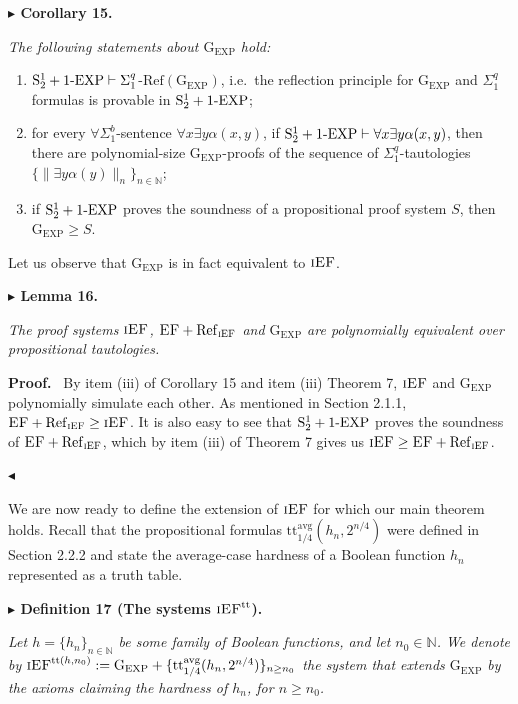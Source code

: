 \documentclass[11pt]{article}
\newcommand{\Stwo}{\mathrm{S}^{1}_{2}}
\newcommand{\oneEXP}{\textnormal{1-EXP}}
\newcommand{\iEF}{\textsc{iEF}}
\newcommand{\EF}{\textsc{EF}}
\newcommand{\GEXP}{\mathrm{G}_{\mathrm{EXP}}}
\newcommand{\N}{\mathbb{N}}
\newcommand{\RefP}{\mathrm{Ref}}
\newcommand{\ttavg}{\mathrm{tt}^{\mathrm{avg}}}
\newcommand{\iEFtt}[1]{\iEF^{\mathrm{tt}(#1)}}
\newenvironment{statement}[1]%
  {\par\medskip\noindent\textbf{#1}\par\nopagebreak\smallskip\noindent\itshape}%
  {\par\medskip}
\newenvironment{authorproof}%
  {\par\medskip\noindent\textbf{Proof.}\ \ignorespaces}%
  {\unskip\par\nopagebreak\smallskip\noindent\hfill$\blacktriangleleft$\par\medskip}
\begin{document}
\begin{statement}{$\blacktriangleright$ Corollary 15.}
The following statements about $\GEXP$ hold:
\begin{enumerate}
\item[(i)] $\Stwo+\oneEXP \vdash \Sigma^{q}_{1}$-$\RefP(\GEXP)$, i.e.\ the reflection principle
  for $\GEXP$ and $\Sigma^{q}_{1}$ formulas is provable in $\Stwo+\oneEXP$;
\item[(ii)] for every $\forall\Sigma^{b}_{1}$-sentence $\forall x\exists y\alpha(x,y)$, if
  $\Stwo+\oneEXP \vdash \forall x\exists y\alpha(x,y)$, then there are polynomial-size
  $\GEXP$-proofs of the sequence of $\Sigma^{q}_{1}$-tautologies
  $\{\|\exists y\alpha(y)\|_{n}\}_{n\in\N}$;
\item[(iii)] if $\Stwo+\oneEXP$ proves the soundness of a propositional proof system $S$, then
  $\GEXP \ge S$.
\end{enumerate}
\end{statement}

Let us observe that $\GEXP$ is in fact equivalent to $\iEF$.

\begin{statement}{$\blacktriangleright$ Lemma 16.}
The proof systems $\iEF$, $\EF+\RefP_{\iEF}$ and $\GEXP$ are polynomially equivalent over
propositional tautologies.
\end{statement}

\begin{authorproof}
By item (iii) of Corollary 15 and item (iii) Theorem 7, $\iEF$ and $\GEXP$ polynomially simulate
each other. As mentioned in Section 2.1.1, $\EF+\RefP_{\iEF} \ge \iEF$. It is also easy to see
that $\Stwo+\oneEXP$ proves the soundness of $\EF+\RefP_{\iEF}$, which by item (iii) of Theorem 7
gives us $\iEF \ge \EF+\RefP_{\iEF}$.
\end{authorproof}

We are now ready to define the extension of $\iEF$ for which our main theorem holds. Recall that
the propositional formulas $\ttavg_{1/4}(h_{n},2^{n/4})$ were defined in Section 2.2.2 and state
the average-case hardness of a Boolean function $h_{n}$ represented as a truth table.

\begin{statement}{$\blacktriangleright$ Definition 17 (The systems $\iEF^{\mathrm{tt}}$).}
Let $h = \{h_{n}\}_{n\in\N}$ be some family of Boolean functions, and let $n_{0} \in \N$. We
denote by $\iEFtt{h,n_{0}} := \GEXP + \{\ttavg_{1/4}(h_{n},2^{n/4})\}_{n\ge n_{0}}$ the system
that extends $\GEXP$ by the axioms claiming the hardness of $h_{n}$, for $n \ge n_{0}$.
\end{statement}
\end{document}
